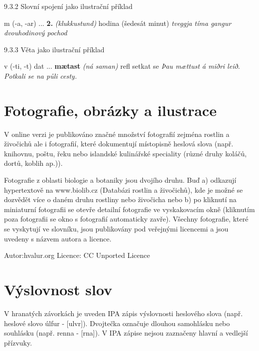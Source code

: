 9.3.2	 Slovní spojení jako ilustrační příklad 

 {\small{m (-a, -ar)}
...
\textbf{2. } \textit{ (klukkustund) }{hodina (šedesát minut)}
\textit{tveggja tíma gangur} \textit{ dvouhodinový pochod  }}

9.3.3	 Věta jako ilustrační příklad 

 {\small{v (-ti, -t) dat}
...
\textbf{mætast } \textit{ (ná saman) }
{\small{ refl }}{setkat se}
\textit{Þau mættust á miðri leið.} \textit{  Potkali se na půli cesty. }} 

\section{Fotografie, obrázky a ilustrace}
V online verzi je publikováno značné množství fotografií zejména rostlin a živočichů ale i fotografií, které dokumentují místopisně heslová slova (např. knihovnu, poštu, řeku nebo islandské kulinářské speciality (různé druhy koláčů, dortů, koblih ap.)).

Fotografie z oblasti biologie a botaniky jsou dvojího druhu. Buď a) odkazují hypertextově na www.biolib.cz (Databázi rostlin a živočichů), kde je možné se dozvědět více o daném druhu rostliny nebo živočicha nebo b) po kliknutí na miniaturní fotografii se otevře detailní fotografie ve vyskakovacím okně (kliknutím poza fotografii se okno s fotografií automaticky zavře).
Všechny fotografie, které se vyskytují ve slovníku, jsou publikovány pod veřejnými licencemi a jsou uvedeny s názvem autora a licence.

\par\begin{center}\setlength\fboxsep{0pt}\setlength\fboxrule{0.5pt}\end{center}
\par\begin{center}\footnotesize {Autor:hvalur.org Licence: CC Unported Licence}\end{center}

\section{Výslovnost slov }
V hranatých závorkách je uveden IPA zápis výslovnosti heslového slova (např. heslové slovo úlfur - [ulv{\textscy}r]). Dvojtečka označuje dlouhou samohlásku nebo souhlásku (např. renna - [r{\textepsilon}n{\textlengthmark}a]). V IPA zápise nejsou zaznačeny hlavní a vedlejší přízvuky.


